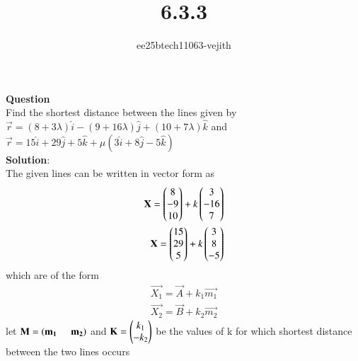 \documentclass[journal]{IEEEtran}
\begin{document}

\vspace{3cm}

\title{6.3.3}
\author{ee25btech11063-vejith}

\maketitle
{\let\newpage\relax\maketitle}
\renewcommand{\thefigure}{\theenumi}
\renewcommand{\thetable}{\theenumi}
\setlength{\intextsep}{10pt} %
\textbf{Question}\\
Find the shortest distance between the lines given by\\
$\vec{r} = (8 + 3\lambda) \hat{i} - (9 + 16\lambda) \hat{j} + (10 + 7\lambda) \hat{k}$ and \\$ \vec{r} = 15 \hat{i} + 29 \hat{j} + 5 \hat{k} + \mu (3 \hat{i} + 8 \hat{j} - 5 \hat{k})$\\
\textbf{Solution}:\\
The given lines can be written in vector form as
\begin{align}
    \mathbf{X}=\begin{pmatrix}8\\-9\\10\end{pmatrix}+k\begin{pmatrix}3\\-16\\7\end{pmatrix}\\
    \mathbf{X}=\begin{pmatrix}15\\29\\5\end{pmatrix}+k\begin{pmatrix}3\\8\\-5\end{pmatrix}\\
    \end{align}
which are of the form
\begin{align}
    \vec{X_1}=\vec{A} + k_1\vec{m_1}\\
    \vec{X_2}=\vec{B} + k_2\vec{m_2}
    \end{align}
     let  $\mathbf{M}=\left(\mathbf{m_1}\hspace{0.5cm}\mathbf{m_2}\right)$  and  $\mathbf{K}=\begin{pmatrix}k_1\\-k_2\end{pmatrix}$ be the values of k for which shortest distance between the two lines occurs 
\end{document}
